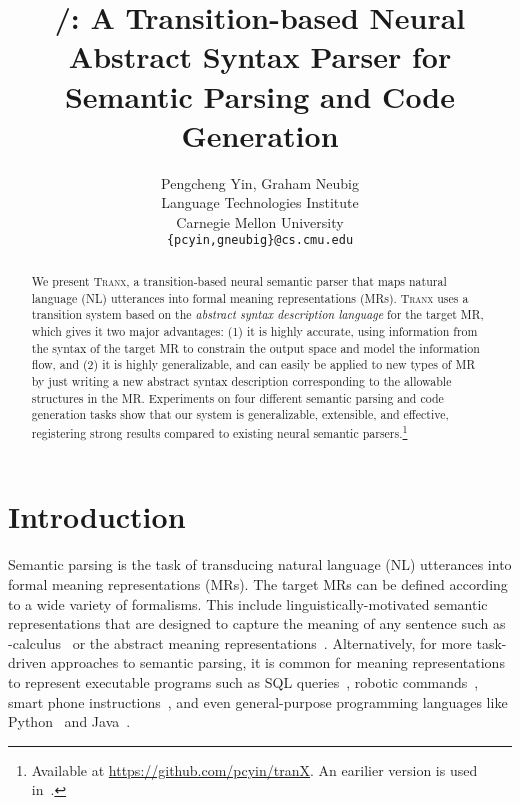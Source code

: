 \documentclass[11pt,a4paper]{article}
\title{\textbf{\model/}: A Transition-based Neural Abstract Syntax Parser for Semantic Parsing and Code Generation}
\author{Pengcheng Yin, Graham Neubig \\
  Language Technologies Institute \\
  Carnegie Mellon University \\
  {\tt \{pcyin,gneubig\}@cs.cmu.edu}}
\date{}
\renewcommand{\tt}[1]{\fontfamily{cmtt}\selectfont #1}
\def\model/{\textsc{Tranx}}
\begin{document}
\maketitle
\begin{abstract}
 We present \model/, a transition-based neural semantic parser that maps natural language (NL) utterances into formal meaning representations (MRs).
 \model/ uses a transition system based on the \emph{abstract syntax description language} for the target MR, which gives it two major advantages: 
 (1) it is highly accurate, using information from the syntax of the target MR to constrain the output space and model the information flow, and 
 (2) it is highly generalizable, and can easily be applied to new types of MR by just writing a new abstract syntax description corresponding to the allowable structures in the MR.
Experiments on four different semantic parsing and code generation tasks show that our system is generalizable, extensible, and effective, registering strong results compared to existing neural semantic parsers.\footnote{Available at \href{https://github.com/pcyin/tranX}{\tt https://github.com/pcyin/tranX}. An earilier version is used in~\citet{yin18acl}.}
\end{abstract}

\section{Introduction}



Semantic parsing is the task of transducing natural language (NL) utterances into formal meaning representations (MRs).
The target MRs can be defined according to a wide variety of formalisms.
This include linguistically-motivated semantic representations that are designed to capture the meaning of any sentence such as -calculus~\citep{ZettlemoyerC05} or the abstract meaning representations~\citep{banarescu13amr}.
Alternatively, for more task-driven approaches to semantic parsing, it is common for meaning representations to represent executable programs such as SQL queries~\citep{DBLP:journals/corr/abs-1709-00103}, robotic commands~\cite{artzi-zettlemoyer:2013:TACL}, smart phone instructions~\cite{DBLP:conf/acl/QuirkMG15}, and even general-purpose programming languages like Python~\citep{yin17acl,rabinovich17syntaxnet} and Java~\cite{DBLP:conf/acl/LingBGHKWS16}.
\end{document}
